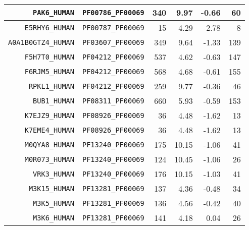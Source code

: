 \begin{longtable}[c]{||r|r|r|r|r|r||}
  \hline
  \texttt{PAK6\_HUMAN} & \texttt{PF00786\_PF00069} & 340 & 9.97 & -0.66 & 60 \\
  \hline
  \texttt{E5RHY6\_HUMAN} & \texttt{PF00787\_PF00069} & 15 & 4.29 & -2.78 & 8 \\
  \hline
  \texttt{A0A1B0GTZ4\_HUMAN} & \texttt{PF03607\_PF00069} & 349 & 9.64 & -1.33 & 139 \\
  \hline
  \texttt{F5H7T0\_HUMAN} & \texttt{PF04212\_PF00069} & 537 & 4.62 & -0.63 & 147 \\
  \hline
  \texttt{F6RJM5\_HUMAN} & \texttt{PF04212\_PF00069} & 568 & 4.68 & -0.61 & 155 \\
  \hline
  \texttt{RPKL1\_HUMAN} & \texttt{PF04212\_PF00069} & 259 & 9.77 & -0.36 & 46 \\
  \hline
  \texttt{BUB1\_HUMAN} & \texttt{PF08311\_PF00069} & 660 & 5.93 & -0.59 & 153 \\
  \hline
  \texttt{K7EJZ9\_HUMAN} & \texttt{PF08926\_PF00069} & 36 & 4.48 & -1.62 & 13 \\
  \hline
  \texttt{K7EME4\_HUMAN} & \texttt{PF08926\_PF00069} & 36 & 4.48 & -1.62 & 13 \\
  \hline
  \texttt{M0QYA8\_HUMAN} & \texttt{PF13240\_PF00069} & 175 & 10.15 & -1.06 & 41 \\
  \hline
  \texttt{M0R073\_HUMAN} & \texttt{PF13240\_PF00069} & 124 & 10.45 & -1.06 & 26 \\
  \hline
  \texttt{VRK3\_HUMAN} & \texttt{PF13240\_PF00069} & 176 & 10.15 & -1.03 & 41 \\
  \hline
  \texttt{M3K15\_HUMAN} & \texttt{PF13281\_PF00069} & 137 & 4.36 & -0.48 & 34 \\
  \hline
  \texttt{M3K5\_HUMAN} & \texttt{PF13281\_PF00069} & 136 & 4.56 & -0.42 & 40 \\
  \hline
  \texttt{M3K6\_HUMAN} & \texttt{PF13281\_PF00069} & 141 & 4.18 & 0.04 & 26 \\
  \hline

\end{longtable}
